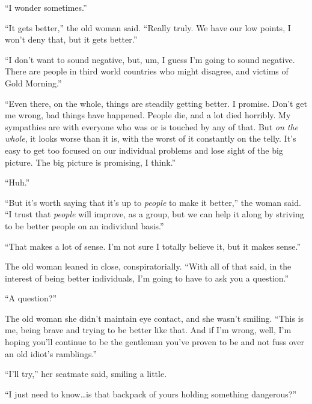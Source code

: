 ``I wonder sometimes.''



``It gets better,'' the old woman said.  ``Really truly.  We have our low points, I won't deny that, but it gets better.''



``I don't want to sound negative, but, um, I guess I'm going to sound negative.  There are people in third world countries who might disagree, and victims of Gold Morning.''



``Even there, on the whole, things are steadily getting better.  I promise.  Don't get me wrong, bad things have happened.  People die, and a lot died horribly.  My sympathies are with everyone who was or is touched by any of that.  But \emph{on the whole}, it looks worse than it is, with the worst of it constantly on the telly.  It's easy to get too focused on our individual problems and lose sight of the big picture.  The big picture is promising, I think.''



``Huh.''



``But it's worth saying that it's up to \emph{people} to make it better,'' the woman said.  ``I trust that \emph{people} will improve, as a group, but we can help it along by striving to be better people on an individual basis.''



``That makes a lot of sense.  I'm not sure I totally believe it, but it makes sense.''



The old woman leaned in close, conspiratorially. ``With all of that said, in the interest of being better individuals, I'm going to have to ask you a question.''



``A question?''



The old woman she didn't maintain eye contact, and she wasn't smiling.  ``This is me, being brave and trying to be better like that.  And if I'm wrong, well, I'm hoping you'll continue to be the gentleman you've proven to be and not fuss over an old idiot's ramblings.''



``I'll try,'' her seatmate said, smiling a little.



``I just need to know\ldots is that backpack of yours holding something dangerous?''



